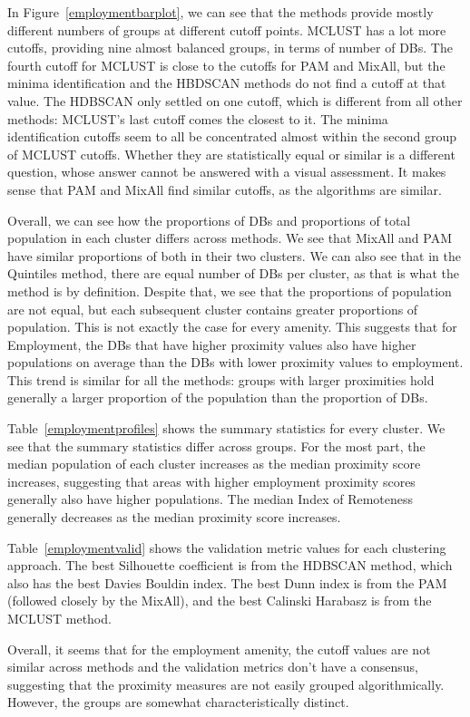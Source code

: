 \documentclass[11pt, a4paper]{article}
\begin{document}
In Figure~\ref{employmentbarplot}, we can see that the methods provide mostly different numbers of groups at different cutoff points. MCLUST has a lot more cutoffs, providing nine almost balanced groups, in terms of number of DBs. The fourth cutoff for MCLUST is close to the cutoffs for PAM and MixAll, but the minima identification and the HBDSCAN methods do not find a cutoff at that value. The HDBSCAN only settled on one cutoff, which is different from all other methods: MCLUST's last cutoff comes the closest to it. The minima identification cutoffs seem to all be concentrated almost within the second group of MCLUST cutoffs. Whether they are statistically equal or similar is a different question, whose answer cannot be answered with a visual assessment. It makes sense that PAM and MixAll find similar cutoffs, as the algorithms are similar.
\par
Overall, we can see how the proportions of DBs and proportions of total population in each cluster differs across methods.  We see that MixAll and PAM have similar proportions of both in their two clusters. We can also see that in the Quintiles method, there are equal number of DBs per cluster, as that is what the method is by definition.  Despite that,  we see that the proportions of population are not equal, but each subsequent cluster contains greater proportions of population. This is not exactly the case for every amenity. This suggests that for Employment, the DBs that have higher proximity values also have higher populations on average than the DBs with lower proximity values to employment.  This trend is similar for all the methods: groups with larger proximities hold generally a larger proportion of the population than the proportion of DBs.
\par
Table~\ref{employmentprofiles} shows the summary statistics for every cluster. We see that the summary statistics differ across groups. For the most part, the median population of each cluster increases as the median proximity score increases, suggesting that areas with higher employment proximity scores generally also have higher populations. The median Index of Remoteness generally decreases as the median proximity score increases.
\par
Table~\ref{employmentvalid} shows the validation metric values for each clustering approach. The best Silhouette coefficient is from the HDBSCAN method, which also has the best Davies Bouldin index. The best Dunn index is from the PAM (followed closely by the MixAll), and the best Calinski Harabasz is from the MCLUST method.
\par
Overall, it seems that for the employment amenity, the cutoff values are not similar across methods and the validation metrics don't have a consensus, suggesting that the proximity measures are not easily grouped algorithmically. However, the groups are somewhat characteristically distinct.
\end{document}
